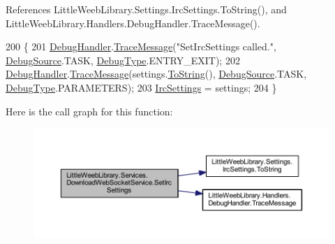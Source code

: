 References Little\+Weeb\+Library.\+Settings.\+Irc\+Settings.\+To\+String(), and Little\+Weeb\+Library.\+Handlers.\+Debug\+Handler.\+Trace\+Message().


\begin{DoxyCode}
200         \{
201             \mbox{\hyperlink{class_little_weeb_library_1_1_handlers_1_1_debug_handler}{DebugHandler}}.\mbox{\hyperlink{class_little_weeb_library_1_1_handlers_1_1_debug_handler_afccb37dfd6b2114af72000c2f4fe4607}{TraceMessage}}(\textcolor{stringliteral}{"SetIrcSettings called."}, 
      \mbox{\hyperlink{namespace_little_weeb_library_1_1_handlers_a2a6ca0775121c9c503d58aa254d292be}{DebugSource}}.TASK, \mbox{\hyperlink{namespace_little_weeb_library_1_1_handlers_ab66019ed40462876ec4e61bb3ccb0a62}{DebugType}}.ENTRY\_EXIT);
202             \mbox{\hyperlink{class_little_weeb_library_1_1_handlers_1_1_debug_handler}{DebugHandler}}.\mbox{\hyperlink{class_little_weeb_library_1_1_handlers_1_1_debug_handler_afccb37dfd6b2114af72000c2f4fe4607}{TraceMessage}}(settings.\mbox{\hyperlink{class_little_weeb_library_1_1_settings_1_1_irc_settings_a2e1d7f26d7d3083d19c3a9e6c6c2d0b2}{ToString}}(), 
      \mbox{\hyperlink{namespace_little_weeb_library_1_1_handlers_a2a6ca0775121c9c503d58aa254d292be}{DebugSource}}.TASK, \mbox{\hyperlink{namespace_little_weeb_library_1_1_handlers_ab66019ed40462876ec4e61bb3ccb0a62}{DebugType}}.PARAMETERS);
203             \mbox{\hyperlink{class_little_weeb_library_1_1_settings_1_1_irc_settings}{IrcSettings}} = settings;
204         \}
\end{DoxyCode}
Here is the call graph for this function\+:\nopagebreak
\begin{figure}[H]
\begin{center}
\leavevmode
\includegraphics[width=350pt]{class_little_weeb_library_1_1_services_1_1_download_web_socket_service_ac692e2804ac253cc2ceac79d88a2e191_cgraph}
\end{center}
\end{figure}
\mbox{\label{class_little_weeb_library_1_1_services_1_1_download_web_socket_service_a4b1d1eda437419a534bb4ee17ed26d4f}} 
